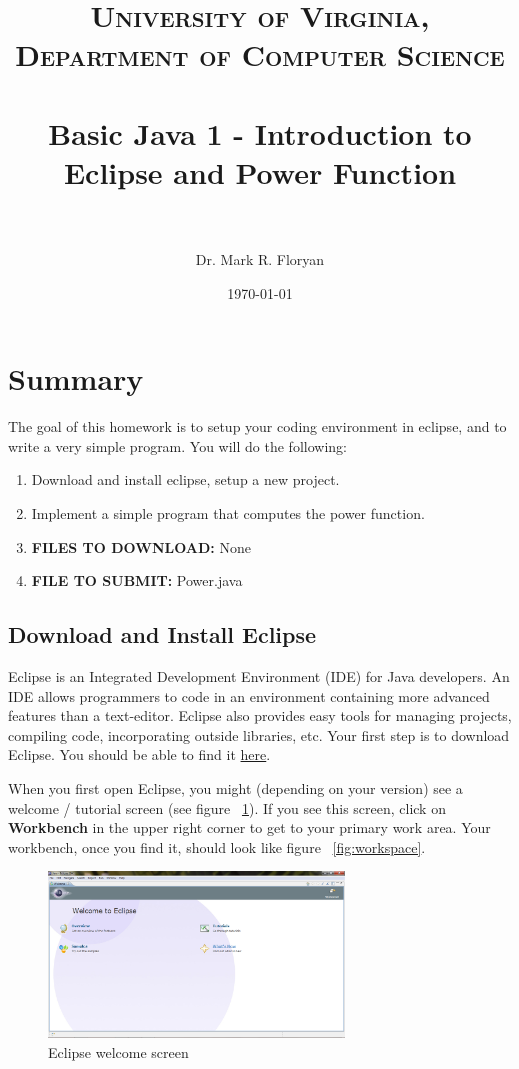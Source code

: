 \documentclass[paper=a4, fontsize=11pt, parskip=full]{scrartcl} %
\title{	
\normalfont \normalsize 
\textsc{University of Virginia, Department of Computer Science} \\ [25pt] %
\horrule{0.5pt} \\[0.4cm] %
\huge Basic Java 1 - Introduction to Eclipse and Power Function \\ %
\horrule{2pt} \\[0.5cm] %
}
\author{Dr. Mark R. Floryan} %
\date{\normalsize\today} %
\numberwithin{equation}{section} %
\numberwithin{figure}{section} %
\numberwithin{table}{section} %
\begin{document}
\maketitle %


\section{Summary}

The goal of this homework is to setup your coding environment in eclipse, and to write a very simple program. You will do the following:

\begin{enumerate}
	\item Download and install eclipse, setup a new project.
	\item Implement a simple program that computes the power function.
	\item \textbf{FILES TO DOWNLOAD:} None
	\item \textbf{FILE TO SUBMIT:} Power.java
\end{enumerate}


\subsection{Download and Install Eclipse}

Eclipse is an Integrated Development Environment (IDE) for Java developers. An IDE allows programmers to code in an environment containing more advanced features than a text-editor. Eclipse also provides easy tools for managing projects, compiling code, incorporating outside libraries, etc. Your first step is to download Eclipse. You should be able to find it \href{https://www.eclipse.org/downloads/}{here}.

When you first open Eclipse, you might (depending on your version) see a welcome / tutorial screen (see figure ~\ref{fig:welcome}). If you see this screen, click on \textbf{Workbench} in the upper right corner to get to your primary work area. Your workbench, once you find it, should look like figure ~\ref{fig:workspace}.

\begin{figure}[H]
\centering
\includegraphics[width=0.7\textwidth]{images/eclipse_welcome.png}
\caption{Eclipse welcome screen}
\label{fig:welcome}
\end{figure}
\end{document}
